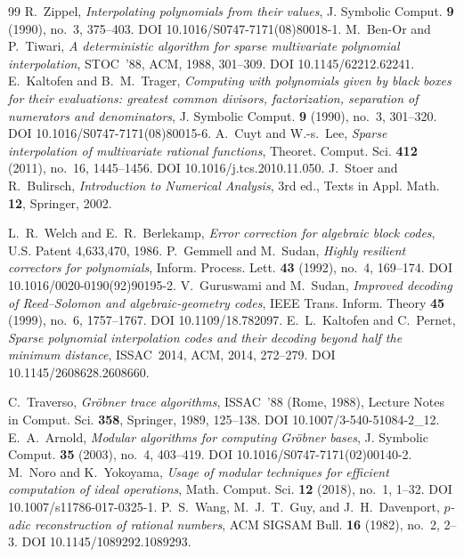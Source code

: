 \documentclass[11pt]{article}
\theoremstyle{definition}
\begin{document}
\begin{thebibliography}{99}
 R.~Zippel, \emph{Interpolating polynomials from their values},
  J. Symbolic Comput. \textbf{9} (1990), no.~3, 375--403. DOI 10.1016/S0747-7171(08)80018-1.
 M.~Ben-Or and P.~Tiwari, \emph{A deterministic algorithm for sparse
  multivariate polynomial interpolation}, STOC~'88, ACM, 1988, 301--309. DOI 10.1145/62212.62241.
 E.~Kaltofen and B.~M.~Trager, \emph{Computing with polynomials given by
  black boxes for their evaluations: greatest common divisors, factorization, separation of
  numerators and denominators}, J. Symbolic Comput. \textbf{9} (1990), no.~3, 301--320.
  DOI 10.1016/S0747-7171(08)80015-6.
 A.~Cuyt and W.-s.~Lee, \emph{Sparse interpolation of multivariate rational
  functions}, Theoret. Comput. Sci. \textbf{412} (2011), no.~16, 1445--1456.
  DOI 10.1016/j.tcs.2010.11.050.
 J.~Stoer and R.~Bulirsch, \emph{Introduction to Numerical Analysis},
  3rd ed., Texts in Appl. Math. \textbf{12}, Springer, 2002.

 L.~R.~Welch and E.~R.~Berlekamp, \emph{Error correction for algebraic block
  codes}, U.S. Patent 4,633,470, 1986.
 P.~Gemmell and M.~Sudan, \emph{Highly resilient correctors for polynomials},
  Inform. Process. Lett. \textbf{43} (1992), no.~4, 169--174. DOI 10.1016/0020-0190(92)90195-2.
 V.~Guruswami and M.~Sudan, \emph{Improved decoding of Reed--Solomon and
  algebraic-geometry codes}, IEEE Trans. Inform. Theory \textbf{45} (1999), no.~6, 1757--1767.
  DOI 10.1109/18.782097.
 E.~L.~Kaltofen and C.~Pernet, \emph{Sparse polynomial interpolation codes
  and their decoding beyond half the minimum distance}, ISSAC~2014, ACM, 2014, 272--279.
  DOI 10.1145/2608628.2608660.

 C.~Traverso, \emph{Gr\"obner trace algorithms}, ISSAC~'88 (Rome, 1988),
  Lecture Notes in Comput. Sci. \textbf{358}, Springer, 1989, 125--138.
  DOI 10.1007/3-540-51084-2\_12.
 E.~A.~Arnold, \emph{Modular algorithms for computing Gr\"obner bases},
  J. Symbolic Comput. \textbf{35} (2003), no.~4, 403--419. DOI 10.1016/S0747-7171(02)00140-2.
 M.~Noro and K.~Yokoyama, \emph{Usage of modular techniques for efficient
  computation of ideal operations}, Math. Comput. Sci. \textbf{12} (2018), no.~1, 1--32.
  DOI 10.1007/s11786-017-0325-1.
 P.~S.~Wang, M.~J.~T.~Guy, and J.~H.~Davenport, \emph{$p$-adic
  reconstruction of rational numbers}, ACM SIGSAM Bull. \textbf{16} (1982), no.~2, 2--3.
  DOI 10.1145/1089292.1089293.

\end{thebibliography}
\end{document}
